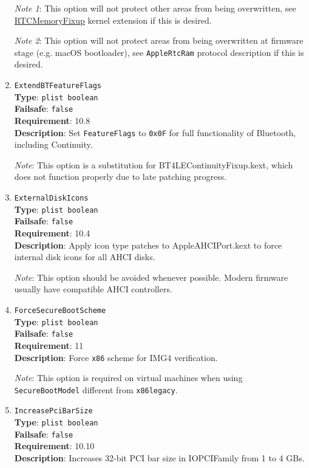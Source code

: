 \documentclass[]{article}
\begin{document}
\begin{enumerate}
  \emph{Note 1}: This option will not protect other areas from being overwritten,
  see \href{https://github.com/acidanthera/RTCMemoryFixup}{RTCMemoryFixup}
  kernel extension if this is desired.

  \emph{Note 2}: This option will not protect areas from being overwritten
  at firmware stage (e.g. macOS bootloader), see \texttt{AppleRtcRam} protocol
  description if this is desired.

\item
  \texttt{ExtendBTFeatureFlags}\\
  \textbf{Type}: \texttt{plist\ boolean}\\
  \textbf{Failsafe}: \texttt{false}\\
  \textbf{Requirement}: 10.8\\
  \textbf{Description}: Set \texttt{FeatureFlags} to \texttt{0x0F} for full
  functionality of Bluetooth, including Continuity.

  \emph{Note}: This option is a substitution for BT4LEContinuityFixup.kext,
  which does not function properly due to late patching progress.

\item
  \texttt{ExternalDiskIcons}\\
  \textbf{Type}: \texttt{plist\ boolean}\\
  \textbf{Failsafe}: \texttt{false}\\
  \textbf{Requirement}: 10.4\\
  \textbf{Description}: Apply icon type patches to AppleAHCIPort.kext to force
  internal disk icons for all AHCI disks.

  \emph{Note}: This option should be avoided whenever possible. Modern firmware
  usually have compatible AHCI controllers.

\item
  \texttt{ForceSecureBootScheme}\\
  \textbf{Type}: \texttt{plist\ boolean}\\
  \textbf{Failsafe}: \texttt{false}\\
  \textbf{Requirement}: 11\\
  \textbf{Description}: Force \texttt{x86} scheme for IMG4 verification.

  \emph{Note}: This option is required on virtual machines when using
  \texttt{SecureBootModel} different from \texttt{x86legacy}.

\item
  \texttt{IncreasePciBarSize}\\
  \textbf{Type}: \texttt{plist\ boolean}\\
  \textbf{Failsafe}: \texttt{false}\\
  \textbf{Requirement}: 10.10\\
  \textbf{Description}: Increases 32-bit PCI bar size in IOPCIFamily from 1 to 4 GBs.


\end{enumerate}
\end{document}

